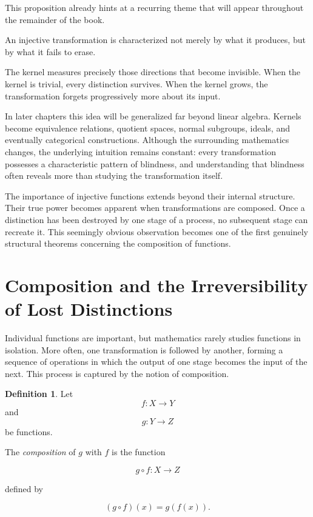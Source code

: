 \documentclass[11pt]{book}
\numberwithin{equation}{chapter}
\theoremstyle{definition}
\newtheorem{definition}{Definition}[chapter]
\theoremstyle{plain}
\theoremstyle{remark}
\begin{document}
This proposition already hints at a recurring theme that will appear throughout the remainder of the book.

An injective transformation is characterized not merely by what it produces, but by what it fails to erase.

The kernel measures precisely those directions that become invisible. When the kernel is trivial, every distinction survives. When the kernel grows, the transformation forgets progressively more about its input.

In later chapters this idea will be generalized far beyond linear algebra. Kernels become equivalence relations, quotient spaces, normal subgroups, ideals, and eventually categorical constructions. Although the surrounding mathematics changes, the underlying intuition remains constant: every transformation possesses a characteristic pattern of blindness, and understanding that blindness often reveals more than studying the transformation itself.

The importance of injective functions extends beyond their internal structure. Their true power becomes apparent when transformations are composed. Once a distinction has been destroyed by one stage of a process, no subsequent stage can recreate it. This seemingly obvious observation becomes one of the first genuinely structural theorems concerning the composition of functions.


\section{Composition and the Irreversibility of Lost Distinctions}

Individual functions are important, but mathematics rarely studies functions in isolation. More often, one transformation is followed by another, forming a sequence of operations in which the output of one stage becomes the input of the next. This process is captured by the notion of composition.

\begin{definition}
Let
\[
f:X\rightarrow Y
\]
and
\[
g:Y\rightarrow Z
\]
be functions.

The \emph{composition} of \(g\) with \(f\) is the function

\[
g\circ f:X\rightarrow Z
\]

defined by

\[
(g\circ f)(x)=g(f(x)).
\]
\end{definition}
\end{document}
